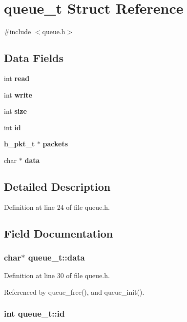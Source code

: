 \section{queue\-\_\-t Struct Reference}
\label{structqueue__t}


{\ttfamily \#include $<$queue.\-h$>$}

\subsection*{Data Fields}
\begin{DoxyCompactItemize}
\item 
int {\bf read}
\item 
int {\bf write}
\item 
int {\bf size}
\item 
int {\bf id}
\item 
{\bf h\-\_\-pkt\-\_\-t} $\ast$ {\bf packets}
\item 
char $\ast$ {\bf data}
\end{DoxyCompactItemize}


\subsection{Detailed Description}


Definition at line 24 of file queue.\-h.



\subsection{Field Documentation}
\subsubsection[{data}]{\setlength{\rightskip}{0pt plus 5cm}char$\ast$ queue\-\_\-t\-::data}\label{structqueue__t_ae00907ee5319feb0fea374be3785bdb2}


Definition at line 30 of file queue.\-h.



Referenced by queue\-\_\-free(), and queue\-\_\-init().

\subsubsection[{id}]{\setlength{\rightskip}{0pt plus 5cm}int queue\-\_\-t\-::id}\label{structqueue__t_a6d9023097f98241daf5e40c96a401c30}


